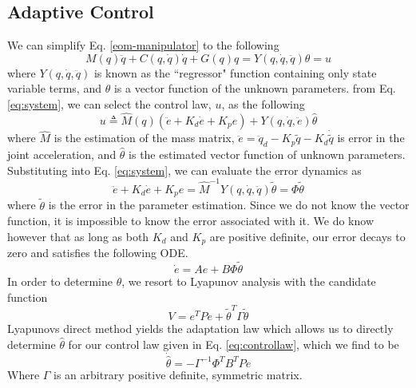 \subsection*{Adaptive Control}
We can simplify Eq. \eqref{eom-manipulator} to the following
\begin{equation}
	M(q)\ddot{q} + C(q,\dot{q})\dot{q} + G(q)q = Y(q,\dot{q},\ddot{q})\theta = u
	\label{eq:system}
\end{equation}
where $Y(q,\dot{q},\ddot{q})$ is known as the ``regressor" function containing only state variable terms, and $\theta$ is a vector function of the unknown parameters. from Eq. \eqref{eq:system}, we can select the control law, $u$, as the following
\begin{equation}
	u \triangleq \hat{M}(q)(\ddot{e} + K_{d}\dot{e} + K_{p}e) + Y(q,\dot{q},\ddot{e})\hat{\theta}
	\label{eq:controllaw}
\end{equation}
where $\hat{M}$ is the estimation of the mass matrix, $\ddot{e}=\ddot{q}_{d} - K_{p}\tilde{q} - K_{d}\dot{\tilde{q}}$ is error in the joint acceleration, and $\hat{\theta}$ is the estimated vector function of unknown parameters. Substituting into Eq. \eqref{eq:system}, we can evaluate the error dynamics as
\begin{equation}
	\ddot{e} + K_{d}\dot{e} + K_{p}e = \hat{M}^{-1}Y(q,\dot{q},\ddot{q})\tilde{\theta} = \Phi\tilde{\theta}
\end{equation}
where $\tilde{\theta}$ is the error in the parameter estimation. Since we do not know the vector function, it is impossible to know the error associated with it. We do know however that as long as both $K_{d}$ and $K_{p}$ are positive definite, our error decays to zero and satisfies the following ODE.
\begin{equation}
	\dot{e} = Ae + B\Phi\tilde{\theta}
\end{equation}
In order to determine $\theta$, we resort to Lyapunov analysis with the candidate function
\begin{equation}
	V = e^{T}Pe + \tilde{\theta}^{T}\Gamma\tilde{\theta}
\end{equation}
Lyapunovs direct method yields the adaptation law which allows us to directly determine $\hat{\theta}$ for our control law given in Eq. \eqref{eq:controllaw}, which we find to be
\begin{equation}
	\dot{\hat{\theta}} = -\Gamma^{-1}\Phi^{T}B^{T}Pe
	\label{eq:adaptLaw}
\end{equation}
Where $\Gamma$ is an arbitrary positive definite, symmetric matrix.
